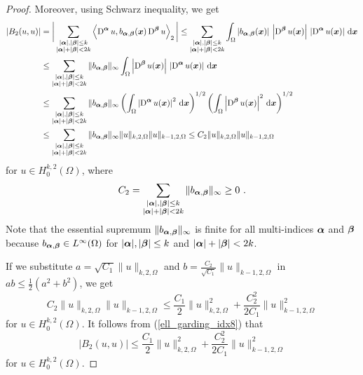 \begin{proof}
Moreover, using Schwarz inequality, we get
\begin{align}
\left| B_2(u,u) \right|
&= \bigg| \sum_{\substack{|{\bm{\alpha}}|,|{\bm{\beta}}|\leq k\\
|{\bm{\alpha}}|+|{\bm{\beta}}|<2k}}
\left\langle{\operatorname{D}^{{\bm{\alpha}}} u} , {b_{{\bm{\alpha}},{\bm{\beta}}}({\bm{x}})
\operatorname{D}^{{\bm{\beta}}} u}\right\rangle_2 \bigg|
\leq \sum_{\substack{|{\bm{\alpha}}|,|{\bm{\beta}}|\leq k\\
|{\bm{\alpha}}|+|{\bm{\beta}}|<2k}}
\int_{\Omega} \left| b_{{\bm{\alpha}},{\bm{\beta}}}({\bm{x}})\right|\,
\left| \operatorname{D}^{{\bm{\beta}}} u({\bm{x}}) \right| \,
\left| \operatorname{D}^{{\bm{\alpha}}} u({\bm{x}}) \right| \,\mathrm{d}{{\bm{x}}} \nonumber \\
&\leq \sum_{\substack{|{\bm{\alpha}}|,|{\bm{\beta}}|\leq k\\
|{\bm{\alpha}}|+|{\bm{\beta}}|<2k}}
\| b_{{\bm{\alpha}},{\bm{\beta}}} \|_{\infty}
\int_{\Omega} \left| \operatorname{D}^{{\bm{\beta}}} u({\bm{x}}) \right| \,
\left| \operatorname{D}^{{\bm{\alpha}}} u({\bm{x}}) \right| \,\mathrm{d}{{\bm{x}}} \nonumber \\
&\leq \sum_{\substack{|{\bm{\alpha}}|,|{\bm{\beta}}|\leq k\\
|{\bm{\alpha}}|+|{\bm{\beta}}|<2k}}
\| b_{{\bm{\alpha}},{\bm{\beta}}} \|_{\infty}
\left( \int_\Omega \left| \operatorname{D}^{{\bm{\alpha}}} u({\bm{x}}) \right|^2
\,\mathrm{d}{{\bm{x}}}\right)^{1/2}
\left( \int_\Omega \left| \operatorname{D}^{{\bm{\beta}}} u({\bm{x}}) \right|^2 \,\mathrm{d}{{\bm{x}}}
\right)^{1/2} \nonumber \\
&\leq \sum_{\substack{|{\bm{\alpha}}|,|{\bm{\beta}}|\leq k\\
|{\bm{\alpha}}|+|{\bm{\beta}}|<2k}}
\| b_{{\bm{\alpha}},{\bm{\beta}}} \|_{\infty}
\|u\|_{k,2,\Omega} \|u\|_{k-1,2,\Omega} \leq C_2 \|u\|_{k,2,\Omega}
\|u\|_{k-1,2,\Omega} \label{ell_garding_idx8}
\end{align}
for $\displaystyle u \in H^{k,2}_0(\Omega)$, where
\[
C_2 = \sum_{\substack{|{\bm{\alpha}}|,|{\bm{\beta}}|\leq k\\
|{\bm{\alpha}}|+|{\bm{\beta}}|<2k}}
\| b_{{\bm{\alpha}},{\bm{\beta}}} \|_{\infty} \geq 0 \ .
\]
Note that the essential supremum
$\displaystyle \| b_{{\bm{\alpha}},{\bm{\beta}}} \|_{\infty}$ is finite
for all multi-indices ${\bm{\alpha}}$ and ${\bm{\beta}}$ because
$b_{{\bm{\alpha}},{\bm{\beta}}} \in L^\infty(\Omega)$ for
$|{\bm{\alpha}}|,|{\bm{\beta}}|\leq k$
and $|{\bm{\alpha}}|+|{\bm{\beta}}|<2k$.

If we substitute $a= \sqrt{C_1} \|u\|_{k,2,\Omega}$ and
$\displaystyle b = \frac{C_2}{\sqrt{C_1}}\|u\|_{k-1,2,\Omega}$ in
$\displaystyle ab \leq \frac{1}{2}(a^2+b^2)$, we get
\[
C_2\|u\|_{k,2,\Omega} \|u\|_{k-1,2,\Omega}
\leq \frac{C_1}{2} \|u\|_{k,2,\Omega}^2 + \frac{C_2^2}{2C_1}\|u\|_{k-1,2,\Omega}^2
\]
for $\displaystyle u \in H^{k,2}_0(\Omega)$.  It follows from
(\ref{ell_garding_idx8}) that
\begin{equation} \label{ell_garding_idx5}
\left|B_2(u,u)\right|
\leq \frac{C_1}{2} \|u\|_{k,2,\Omega}^2 + \frac{C_2^2}{2C_1}\|u\|_{k-1,2,\Omega}^2
\end{equation}
for $\displaystyle u \in H^{k,2}_0(\Omega)$.


\end{proof}
